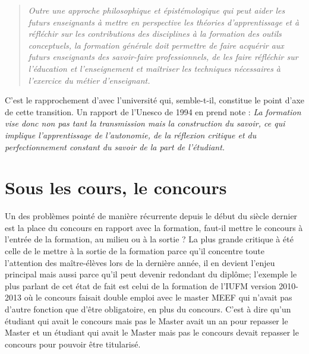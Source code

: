 \documentclass[a4paper,11pt]{article}
\begin{document}
\begin{quote}
\emph{Outre une approche philosophique et épistémologique qui peut aider les futurs enseignants à mettre en perspective les théories d'apprentissage et à réfléchir sur les contributions des disciplines à la formation des outils conceptuels, la formation générale doit permettre de faire acquérir aux futurs enseignants des savoir-faire professionnels, de les faire réfléchir sur l'éducation et l'enseignement et maîtriser les techniques nécessaires à l'exercice du métier d'enseignant.}
\end{quote}
C'est le rapprochement d'avec l'université qui, semble-t-il, constitue le point d'axe de cette transition. Un rapport de l'Unesco de 1994 en prend note \cite{cam94} : \emph{La formation vise donc non pas tant la transmission mais la construction du savoir, ce qui implique l'apprentissage de l'autonomie, de la réflexion critique et du perfectionnement constant du savoir de la part de l'étudiant.}
\section{Sous les cours, le concours}
Un des problèmes pointé de manière récurrente depuis le début du siècle dernier est la place du concours en rapport avec la formation, faut-il mettre le concours à l'entrée de la formation, au milieu ou à la sortie ? La plus grande critique à été celle de le mettre à la sortie de la formation parce qu'il concentre toute l'attention des maître-élèves lors de la dernière année, il en devient l'enjeu principal mais aussi parce qu'il peut devenir redondant du diplôme; l'exemple le plus parlant de cet état de fait est celui de la formation de l'IUFM version 2010-2013 où le concours faisait double emploi avec le master MEEF qui n'avait pas d'autre fonction que d'être obligatoire, en plus du concours. C'est à dire qu'un étudiant qui avait le concours mais pas le Master avait un an pour repasser le Master et un étudiant qui avait le Master mais pas le concours devait repasser le concours pour pouvoir être titularisé.
			
\end{document}
